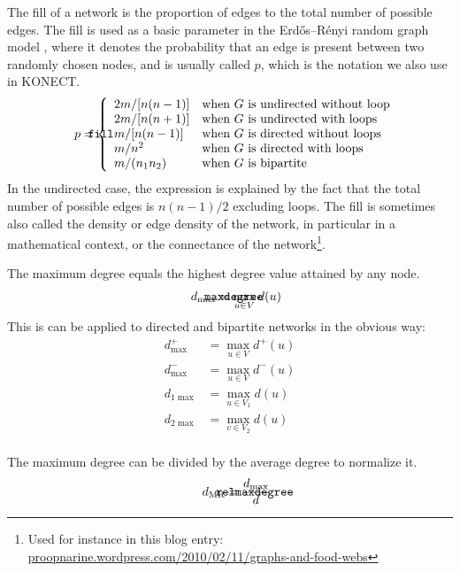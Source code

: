 \documentclass{article}
\def\mathnote#1{%
  \tag*{\rlap{\hspace\marginparsep\smash{\parbox[t]{\marginparwidth}{#1}}}}
}
\begin{document}
The fill of a network is the proportion of edges to the total
number of possible edges. 
The fill is used as a basic parameter in the Erdős--Rényi random graph
model \citep{b569}, where it denotes the probability that an edge is present between
two randomly chosen nodes, and is usually called $p$, which is the
notation we also use in KONECT. 
\begin{align}
  \mathnote{\texttt{fill}}
  p &= \left\{ \begin{array}{ll}
    2m / [n(n-1)] & \text{when $G$ is undirected without loop} \\
    2m / [n(n+1)] & \text{when $G$ is undirected with loops} \\
    m / [n(n-1)] & \text{when $G$ is directed without loops} \\
    m / n^2 & \text{when $G$ is directed with loops} \\
    m / (n_1 n_2) & \text{when $G$ is bipartite} 
  \end{array}\right. 
\end{align}
In the undirected case, the expression is explained by the fact that the
total number of possible edges is $n(n-1)/2$ excluding loops.  
The fill is sometimes also called the density or edge density of the network, in
particular in a mathematical context, or the connectance of the
network\footnote{Used for instance in this blog entry:  \href{https://proopnarine.wordpress.com/2010/02/11/graphs-and-food-webs/}{proopnarine.wordpress.com/2010/02/11/graphs-and-food-webs}}. 

The maximum degree equals the highest degree value attained
by any node.
\begin{align}
  \mathnote{\texttt{maxdegree}}
  d_{\max} &= \max_{u\in V} d(u)
\end{align}
This is can be applied to directed and bipartite networks in the obvious way:
\begin{align*}
  d^+_{\max} &= \max_{u \in V} d^+(u) \\
  d^-_{\max} &= \max_{u \in V} d^-(u) \\
  d_{1 \max} &= \max_{u \in V_1} d(u) \\
  d_{2 \max} &= \max_{v \in V_2} d(u) \\
\end{align*}

The maximum degree can be divided by the average degree to normalize it.
\begin{align}
  \mathnote{\texttt{relmaxdegree}}
  d_{\mathrm{MR}} &= \frac {d_{\max}} {d}
\end{align}
\end{document}
